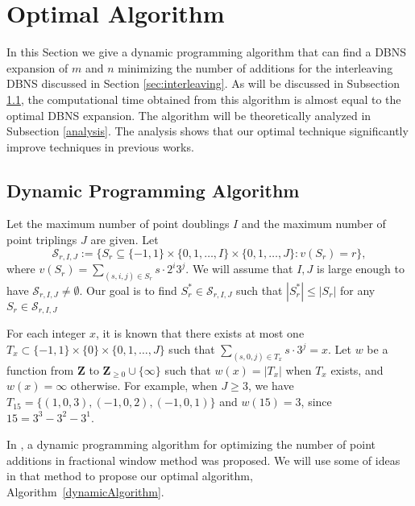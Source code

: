 \section{Optimal Algorithm}

In this Section we give a dynamic programming algorithm that can find a DBNS expansion of $m$ and $n$
minimizing the number of additions for the interleaving DBNS discussed in Section \ref{sec:interleaving}.
As will be discussed in Subsection \ref{dynamic}, the computational time obtained from this algorithm is almost equal to the optimal DBNS expansion.
The algorithm will be theoretically analyzed in Subsection \ref{analysis}. The analysis shows that our optimal technique significantly improve techniques in previous works.

\subsection{Dynamic Programming Algorithm}
\label{dynamic}

Let the maximum number of point doublings $I$ and the maximum number of point triplings $J$ are given.
Let 
$$\mathcal{S}_{r, I, J} := \{S_r \subseteq \{-1,1\} \times \{0, 1, \dots, I\} \times \{0, 1, \dots, J\} : v(S_r) = r\},$$
where $v(S_r) = \sum\limits_{(s,i,j) \in S_r} s\cdot 2^i 3^j$.
We will assume that $I,J$ is large enough to have $\mathcal{S}_{r,I,J} \neq \emptyset$.
Our goal is to find $S_r^* \in \mathcal{S}_{r, I, J}$ such that $\left| S_r^* \right| \leq \left| S_r \right|$ for any $S_r \in \mathcal{S}_{r, I, J}$

For each integer $x$, it is known that there exists at most one $T_x \subset \{-1,1\} \times \{0\} \times \{0, 1, \dots, J\}$
such that $\sum\limits_{(s,0,j) \in T_x} s \cdot 3^j = x$.
Let $w$ be a function from $\mathbf{Z}$ to $\mathbf{Z}_{\geq 0} \cup \{\infty\}$ such that $w(x) = |T_x|$ when $T_x$ exists, and $w(x) = \infty$ otherwise. 
For example, when $J \geq 3$, we have $T_{15} = \{(1, 0, 3), (-1, 0, 2), (-1, 0, 1)\}$ and $w(15) = 3$, since $15 = 3^3 - 3^2 - 3^1$. 

In \cite{analysisMethod}, a dynamic programming algorithm for optimizing the number of point additions in fractional window method was proposed.
We will use some of ideas in that method to propose our optimal algorithm, Algorithm~\ref{dynamicAlgorithm}. 

